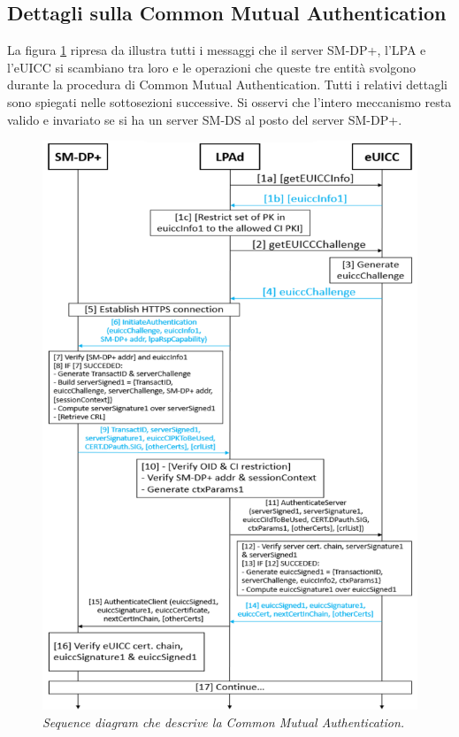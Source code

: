 \documentclass[10pt, oneside]{book}
\begin{document}
\subsection{Dettagli sulla Common Mutual Authentication}\label{sec:mutual-auth}
La figura \ref{fig:common-mutual-auth} ripresa da \cite{GSMA-docs-new} illustra tutti i messaggi che il server SM-DP+, l'LPA e l'eUICC si scambiano tra loro e le operazioni che queste tre entità svolgono durante la procedura di Common Mutual Authentication. Tutti i relativi dettagli \cite{GSMA-docs-new} sono spiegati nelle sottosezioni successive. Si osservi che l'intero meccanismo resta valido e invariato se si ha un server SM-DS al posto del server SM-DP+.
\begin{figure}
\includegraphics[width=\linewidth]{common-mutual-auth.png}
\caption{\textit{Sequence diagram che descrive la Common Mutual Authentication.}}
\label{fig:common-mutual-auth}
\end{figure}
\end{document}
